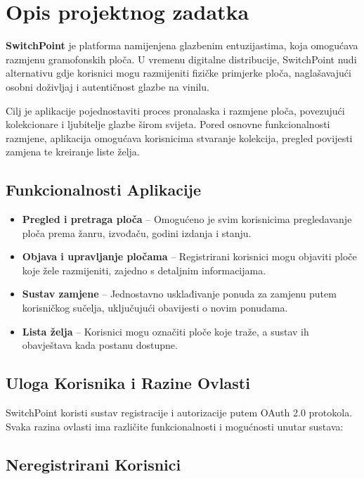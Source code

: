 \chapter{Opis projektnog zadatka}


\textbf{SwitchPoint} je platforma namijenjena glazbenim entuzijastima, koja omogućava razmjenu gramofonskih ploča. U vremenu digitalne distribucije, SwitchPoint nudi alternativu gdje korisnici mogu razmijeniti fizičke primjerke ploča, naglašavajući osobni doživljaj i autentičnost glazbe na vinilu.

Cilj je aplikacije pojednostaviti proces pronalaska i razmjene ploča, povezujući kolekcionare i ljubitelje glazbe širom svijeta. Pored osnovne funkcionalnosti razmjene, aplikacija omogućava korisnicima stvaranje kolekcija, pregled povijesti zamjena te kreiranje liste želja.

\section{Funkcionalnosti Aplikacije}

\begin{itemize}
	\item \textbf{Pregled i pretraga ploča} – Omogućeno je svim korisnicima pregledavanje ploča prema žanru, izvođaču, godini izdanja i stanju.
	\item \textbf{Objava i upravljanje pločama} – Registrirani korisnici mogu objaviti ploče koje žele razmijeniti, zajedno s detaljnim informacijama.
	\item \textbf{Sustav zamjene} – Jednostavno usklađivanje ponuda za zamjenu putem korisničkog sučelja, uključujući obavijesti o novim ponudama.
	\item \textbf{Lista želja} – Korisnici mogu označiti ploče koje traže, a sustav ih obavještava kada postanu dostupne.
\end{itemize}

\section{Uloga Korisnika i Razine Ovlasti}

SwitchPoint koristi sustav registracije i autorizacije putem OAuth 2.0 protokola. Svaka razina ovlasti ima različite funkcionalnosti i mogućnosti unutar sustava:

\section{Neregistrirani Korisnici}

